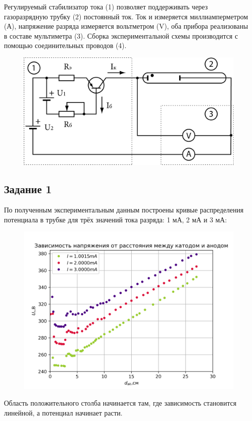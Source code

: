 Регулируемый стабилизатор тока (1) позволяет поддерживать через газоразрядную трубку (2) постоянный ток. Ток и 
измеряется миллиамперметром (А), напряжение разряда измеряется вольтметром (V), оба прибора реализованы в составе 
мультиметра (3). Сборка экспериментальной схемы производится с помощью соединительных проводов (4).
\begin{figure}[h!]
	\centering
	\includegraphics[width=0.5\linewidth]{fig/img5.jpg}
	\caption{}
	\label{fig:4}
\end{figure}

\subsection{Задание 1}
По полученным экспериментальным данным построены кривые распределения потенциала в трубке для трёх значений тока 
разряда: 1 мА, 2 мА и 3 мА:
\begin{figure}[H]
	\centering
	\includegraphics[width=0.75\linewidth]{scripts/z11.png}
	\caption{}
	\label{fig:5}
\end{figure}

Область положительного столба начинается там, где зависимость становится 
линейной, а потенциал начинает расти.

